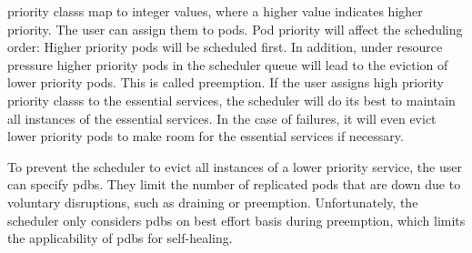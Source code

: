   \Glspl{priority class} map to integer values, where a higher value indicates higher priority.
  The user can assign them to pods.
  Pod priority will affect the scheduling order:
  Higher priority pods will be scheduled first.
  In addition, under resource pressure higher priority pods in the scheduler queue will lead to the eviction of lower priority pods.
  This is called preemption.
  If the user assigns high priority \glspl{priority class} to the essential services, the scheduler will do its best to maintain all instances of the essential services.
  In the case of failures, it will even evict lower priority pods to make room for the essential services if necessary.

  To prevent the scheduler to evict all instances of a lower priority service, the user can specify \glspl{pdb}.
  They limit the number of replicated pods that are down due to voluntary disruptions, such as draining or preemption.
  Unfortunately, the scheduler only considers \glspl{pdb} on best effort basis during preemption, which limits the applicability of \glspl{pdb} for self-healing.
